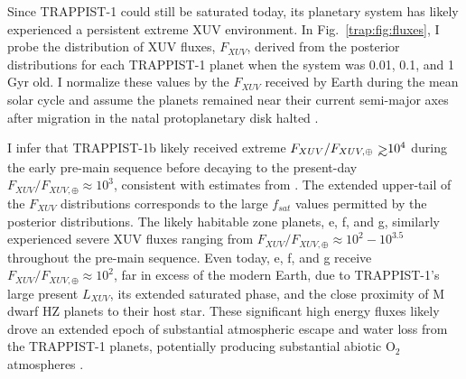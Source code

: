 Since TRAPPIST-1 could still be saturated today, its planetary system has likely experienced a persistent extreme XUV environment. In Fig.~\ref{trap:fig:fluxes}, I probe the distribution of XUV fluxes, $F_{XUV}$, derived from the posterior distributions for each TRAPPIST-1 planet when the system was 0.01, 0.1, and 1 Gyr old. I normalize these values by the $F_{XUV}$ received by Earth during the mean solar cycle \citep[$F_{XUV,\oplus} = 3.88$ erg s$^{-1}$cm$^{-2}$,][]{Ribas2005} and assume the planets remained near their current semi-major axes after migration in the natal protoplanetary disk halted \citep{Luger2017}. 

I infer that TRAPPIST-1b likely received extreme $F_{XUV}/F_{XUV, \oplus} \gsim 10^4$ during the early pre-main sequence before decaying to the present-day $F_{XUV}/F_{XUV, \oplus} \approx 10^3$, consistent with estimates from \citet{Wheatley2017}. The extended upper-tail of the $F_{XUV}$ distributions corresponds to the large $f_{sat}$ values permitted by the posterior distributions. The likely habitable zone planets, e, f, and g, similarly experienced severe XUV fluxes ranging from $F_{XUV}/F_{XUV, \oplus} \approx 10^2 - 10^{3.5}$ throughout the pre-main sequence. Even today, e, f, and g receive $F_{XUV}/F_{XUV, \oplus} \approx 10^2$, far in excess of the modern Earth, due to TRAPPIST-1's large present $L_{XUV}$, its extended saturated phase, and the close proximity of M dwarf HZ planets to their host star. These significant high energy fluxes likely drove an extended epoch of substantial atmospheric escape and water loss from the TRAPPIST-1 planets, potentially producing substantial abiotic O$_2$ atmospheres \citep{Luger2015,Bolmont2017,Bourrier2017a}.

